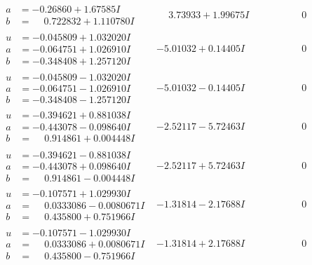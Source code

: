 \documentclass[1p]{elsarticle_modified}
\theoremstyle{definition}
\begin{document}
$$\begin{array}{c|c|c}
\begin{aligned}
a &= -0.26860 + 1.67585 I \\
b &= \phantom{-}0.722832 + 1.110780 I\end{aligned}
 & \phantom{-}3.73933 + 1.99675 I & \phantom{-0.000000 } 0 \\ \hline\begin{aligned}
u &= -0.045809 + 1.032020 I \\
a &= -0.064751 + 1.026910 I \\
b &= -0.348408 + 1.257120 I\end{aligned}
 & -5.01032 + 0.14405 I & \phantom{-0.000000 } 0 \\ \hline\begin{aligned}
u &= -0.045809 - 1.032020 I \\
a &= -0.064751 - 1.026910 I \\
b &= -0.348408 - 1.257120 I\end{aligned}
 & -5.01032 - 0.14405 I & \phantom{-0.000000 } 0 \\ \hline\begin{aligned}
u &= -0.394621 + 0.881038 I \\
a &= -0.443078 - 0.098640 I \\
b &= \phantom{-}0.914861 + 0.004448 I\end{aligned}
 & -2.52117 - 5.72463 I & \phantom{-0.000000 } 0 \\ \hline\begin{aligned}
u &= -0.394621 - 0.881038 I \\
a &= -0.443078 + 0.098640 I \\
b &= \phantom{-}0.914861 - 0.004448 I\end{aligned}
 & -2.52117 + 5.72463 I & \phantom{-0.000000 } 0 \\ \hline\begin{aligned}
u &= -0.107571 + 1.029930 I \\
a &= \phantom{-}0.0333086 - 0.0080671 I \\
b &= \phantom{-}0.435800 + 0.751966 I\end{aligned}
 & -1.31814 - 2.17688 I & \phantom{-0.000000 } 0 \\ \hline\begin{aligned}
u &= -0.107571 - 1.029930 I \\
a &= \phantom{-}0.0333086 + 0.0080671 I \\
b &= \phantom{-}0.435800 - 0.751966 I\end{aligned}
 & -1.31814 + 2.17688 I & \phantom{-0.000000 } 0 \\ \hline\begin{aligned}

\end{aligned}
\end{array}$$
\end{document}
